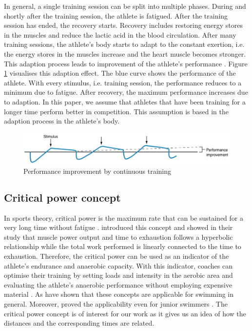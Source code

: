 In general, a single training session can be split into multiple phases. During and shortly after the training session, the athlete is fatigued. After the training session has ended, the recovery starts. Recovery includes restoring energy stores in the muscles and reduce the lactic acid in the blood circulation. After many training sessions, the athlete's body starts to adapt to the constant exertion, i.e. the energy stores in the muscles increase and the heart muscle becomes stronger. This adaption process leads to improvement of the athlete's performance \cite{Bompa.2018.adaption}. Figure \ref{fig:training_improvement} visualises this adaption effect. The blue curve shows the performance of the athlete. With every stimulus, i.e. training session, the performance reduces to a minimum due to fatigue. After recovery, the maximum performance increases due to adaption. In this paper, we assume that athletes that have been training for a longer time perform better in competition. This assumption is based in the adaption process in the athlete's body.
\begin{figure}[ht]
    \centering
    \includegraphics[scale=0.7]{visualisation/training_improvement.png}
    \caption{Performance improvement by continuous training \cite{Bompa.2018.compensation}}
    \label{fig:training_improvement}
\end{figure}
\subsection{Critical power concept} \label{critical_power}
In sports theory, critical power is the maximum rate that can be sustained for a very long time without fatigue \cite{Monod.1965,Hill.1993}. \citet{Monod.1965} introduced this concept and showed in their study that muscle power output and time to exhaustion follows a hyperbolic relationship while the total work performed is linearly connected to the time to exhaustion. Therefore, the critical power can be used as an indicator of the athlete's endurance and anaerobic capacity. With this indicator, coaches can optimise their training by setting loads and intensity in the aerobic area and evaluating the athlete's anaerobic performance without employing expensive material \cite{Dekerle.2002}. As \citet{Wakayoshi.1992} have shown  that these concepts are applicable for swimming in general. Moreover, \citet{Hill.1995} proved the applicability even for junior swimmers . The critical power concept is of interest for our work as it gives us an idea of how the distances and the corresponding times are related.
